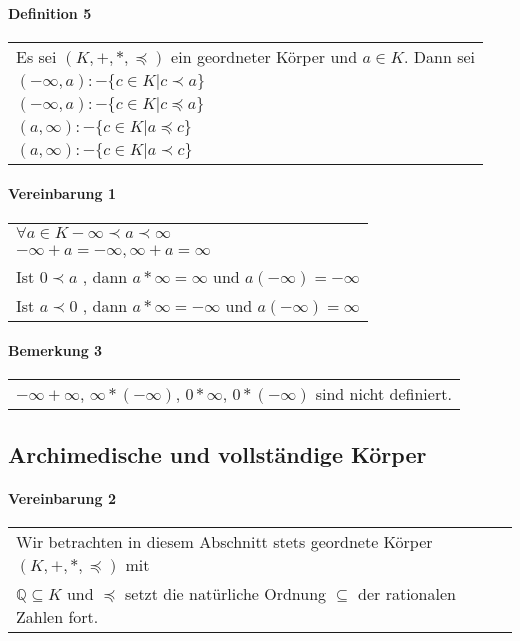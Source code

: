 \documentclass[a4paper]{scrartcl}
\begin{document}
\paragraph{Definition 5}
\begin{tabbing}
\begin{tabular}{l}
Es sei $(K,+,*,\preceq)$ ein geordneter Körper und $a\in K$. Dann sei\\
$(-\infty,a) :- \{ c\in K| c\prec a\}$\\
$(-\infty,a) :- \{ c\in K| c\preceq a\}$\\
$(a,\infty) :- \{ c\in K| a\preceq c\}$\\
$(a,\infty) :- \{ c\in K| a\prec c\}$\\
\end{tabular}
\end{tabbing}

\paragraph{Vereinbarung 1}
\begin{tabbing}
\begin{tabular}{l}
$\forall a\in K -\infty\prec a\prec\infty$\\
$-\infty + a = -\infty , \infty + a = \infty$\\
Ist $0\prec a$ , dann $a*\infty = \infty$ und $a(-\infty) = -\infty$\\
Ist $a\prec 0$ , dann $a*\infty = -\infty$ und $a(-\infty) = \infty$\\
\end{tabular}
\end{tabbing}

\paragraph{Bemerkung 3}
\begin{tabbing}
\begin{tabular}{l}
$-\infty + \infty$, $\infty * (-\infty)$, $0*\infty$, $0*(-\infty)$ sind nicht definiert.
\end{tabular}
\end{tabbing}

\subsection{Archimedische und vollständige Körper}

\paragraph{Vereinbarung 2}
\begin{tabbing}
\begin{tabular}{l}
Wir betrachten in diesem Abschnitt stets geordnete Körper $(K,+,*,\preceq)$ mit\\
$\mathbb{Q}\subseteq K$ und $\preceq$ setzt die natürliche Ordnung $\subseteq$ der rationalen Zahlen fort.
\end{tabular}
\end{tabbing}
\end{document}
